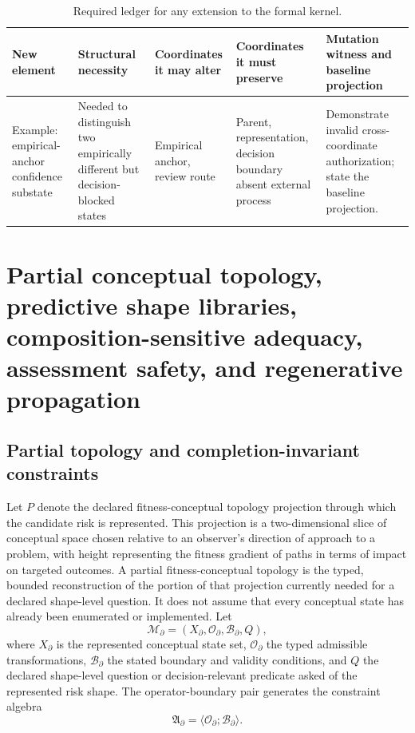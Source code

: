 \documentclass[10pt]{article}
\begin{document}
\begin{table}[htbp]
\centering
\caption{Required ledger for any extension to the formal kernel.}
\label{tab:extension-ledger}
\begin{tabularx}{\textwidth}{>{\raggedright\arraybackslash}p{}p{}p{}p{}X}
\toprule
New element & Structural necessity & Coordinates it may alter & Coordinates it must preserve & Mutation witness and baseline projection \\
\midrule
Example: empirical-anchor confidence substate & Needed to distinguish two empirically different but decision-blocked states & Empirical anchor, review route & Parent, representation, decision boundary absent external process & Demonstrate invalid cross-coordinate authorization; state the baseline projection. \\
\bottomrule
\end{tabularx}
\end{table}

\section{Partial conceptual topology, predictive shape libraries, composition-sensitive adequacy, assessment safety, and regenerative propagation}
\label{sec:composition-supp}

\subsection{Partial topology and completion-invariant constraints}
\label{sec:partial-topology-supp}

Let $P$ denote the declared fitness-conceptual topology projection through which the candidate risk is represented. This projection is a two-dimensional slice of conceptual space chosen relative to an observer's direction of approach to a problem, with height representing the fitness gradient of paths in terms of impact on targeted outcomes. A partial fitness-conceptual topology is the typed, bounded reconstruction of the portion of that projection currently needed for a declared shape-level question. It does not assume that every conceptual state has already been enumerated or implemented. Let
\begin{equation}
\mathcal{M}_{\partial}=(X_{\partial},\mathcal{O}_{\partial},\mathcal{B}_{\partial},Q),
\label{eq:partial-topology-supp}
\end{equation}
where $X_{\partial}$ is the represented conceptual state set, $\mathcal{O}_{\partial}$ the typed admissible transformations, $\mathcal{B}_{\partial}$ the stated boundary and validity conditions, and $Q$ the declared shape-level question or decision-relevant predicate asked of the represented risk shape. The operator-boundary pair generates the constraint algebra
\begin{equation}
\mathfrak{A}_{\partial}=\langle\mathcal{O}_{\partial};\mathcal{B}_{\partial}\rangle.
\label{eq:constraint-algebra-supp}
\end{equation}
\end{document}

